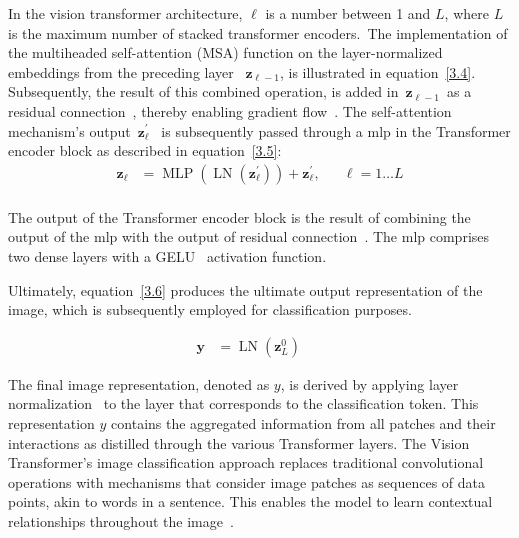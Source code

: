 In the vision transformer architecture, $\ell$ is a number between 1 and $L$, where $L$ is the maximum number of stacked transformer encoders.~The implementation of the multiheaded self-attention (MSA) function on the layer-normalized embeddings from the preceding layer~ $\mathbf{z}_{\ell-1}$, is illustrated in equation~\ref{3.4}. Subsequently, the result of this combined operation, is added in~$\mathbf{z}_{\ell-1}$~as a residual connection~\citep{residual_connection_he2016deep}, thereby enabling gradient flow~\citep{Vit_Paper_Dosovitskiy2020AnII}. The self-attention mechanism's output~$\mathbf{z}_{\ell}^{\prime}$~ is subsequently passed through a \gls{mlp} in the Transformer encoder block as described in equation~\ref{3.5}:
\begin{equation}
\begin{aligned}
\mathbf{z}_{\ell} & =\operatorname{MLP}\left(\operatorname{LN}\left(\mathbf{z}_{\ell}^{\prime}\right)\right)+\mathbf{z}_{\ell}^{\prime}, & & \ell=1 \ldots L \\
\end{aligned}
\label{3.5}
\end{equation}

The output of the Transformer encoder block is the result of combining the output of the \gls{mlp} with the output of residual connection~\citep{Vit_Paper_Dosovitskiy2020AnII}. The \gls{mlp} comprises two dense layers with a GELU~\citep{GELU_act_fxn_hendrycks2016gaussian} activation function.

Ultimately, equation~\ref{3.6} produces the ultimate output representation of the image, which is subsequently employed for classification purposes.

\begin{equation}
\begin{aligned}
\mathbf{y} & =\operatorname{LN}\left(\mathbf{z}_L^0\right) & &
\end{aligned}
\label{3.6}
\end{equation}

The final image representation, denoted as $y$, is derived by applying layer normalization~\citep{Layer_norm_ba2016layer} to the layer that corresponds to the classification token. This representation $y$ contains the aggregated information from all patches and their interactions as distilled through the various Transformer layers. The Vision Transformer's image classification approach replaces traditional convolutional operations with mechanisms that consider image patches as sequences of data points, akin to words in a sentence. This enables the model to learn contextual relationships throughout the image~\citep{Vit_Paper_Dosovitskiy2020AnII}.

